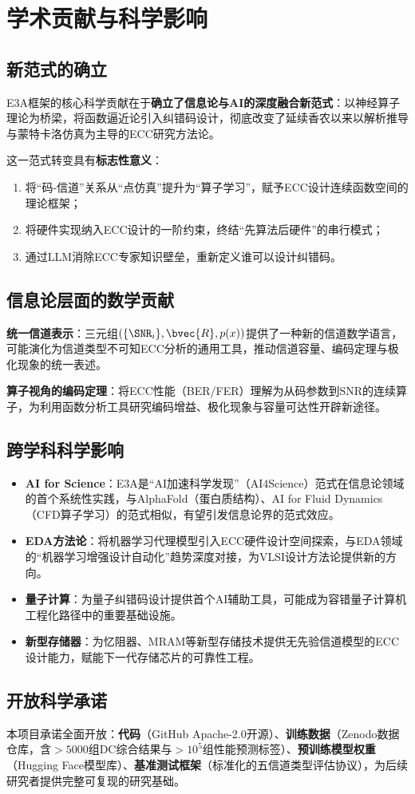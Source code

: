 ﻿\section{学术贡献与科学影响}\label{sec:impact}

\subsection{新范式的确立}

E3A框架的核心科学贡献在于\textbf{确立了信息论与AI的深度融合新范式}：以神经算子理论为桥梁，将函数逼近论引入纠错码设计，彻底改变了延续香农以来以解析推导与蒙特卡洛仿真为主导的ECC研究方法论。

这一范式转变具有\textbf{标志性意义}：
\begin{enumerate}[nosep,leftmargin=2em]
  \item 将``码-信道''关系从``点仿真''提升为``算子学习''，赋予ECC设计连续函数空间的理论框架；
  \item 将硬件实现纳入ECC设计的一阶约束，终结``先算法后硬件''的串行模式；
  \item 通过LLM消除ECC专家知识壁垒，重新定义谁可以设计纠错码。
\end{enumerate}

\subsection{信息论层面的数学贡献}

\textbf{统一信道表示}：三元组$(\{\SNR_i\},\bvec{R},p(x))$提供了一种新的信道数学语言，可能演化为信道类型不可知ECC分析的通用工具，推动信道容量、编码定理与极化现象的统一表述。

\textbf{算子视角的编码定理}：将ECC性能（BER/FER）理解为从码参数到SNR的连续算子，为利用函数分析工具研究编码增益、极化现象与容量可达性开辟新途径。

\subsection{跨学科科学影响}

\begin{itemize}[nosep,leftmargin=1.5em]
  \item \textbf{AI for Science}：E3A是``AI加速科学发现''（AI4Science）范式在信息论领域的首个系统性实践，与AlphaFold（蛋白质结构）、AI for Fluid Dynamics（CFD算子学习）的范式相似，有望引发信息论界的范式效应。
  \item \textbf{EDA方法论}：将机器学习代理模型引入ECC硬件设计空间探索，与EDA领域的``机器学习增强设计自动化''趋势深度对接，为VLSI设计方法论提供新的方向。
  \item \textbf{量子计算}：为量子纠错码设计提供首个AI辅助工具，可能成为容错量子计算机工程化路径中的重要基础设施。
  \item \textbf{新型存储器}：为忆阻器、MRAM等新型存储技术提供无先验信道模型的ECC设计能力，赋能下一代存储芯片的可靠性工程。
\end{itemize}

\subsection{开放科学承诺}

本项目承诺全面开放：\textbf{代码}（GitHub Apache-2.0开源）、\textbf{训练数据}（Zenodo数据仓库，含$>5000$组DC综合结果与$>10^5$组性能预测标签）、\textbf{预训练模型权重}（Hugging Face模型库）、\textbf{基准测试框架}（标准化的五信道类型评估协议），为后续研究者提供完整可复现的研究基础。